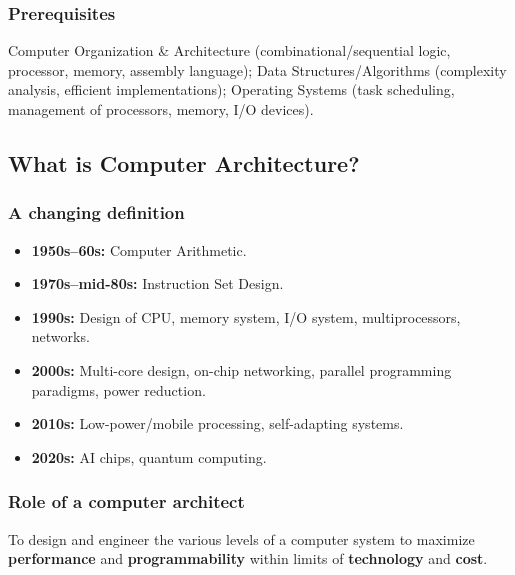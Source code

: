 \subsubsection{Prerequisites}
Computer Organization \& Architecture (combinational/sequential logic,
processor, memory, assembly language); Data Structures/Algorithms
(complexity analysis, efficient implementations); Operating Systems (task
scheduling, management of processors, memory, I/O devices).

\subsection{What is Computer Architecture?}

\subsubsection{A changing definition}
\begin{itemize}
  \item \textbf{1950s--60s:} Computer Arithmetic.
  \item \textbf{1970s--mid-80s:} Instruction Set Design.
  \item \textbf{1990s:} Design of CPU, memory system, I/O system,
  multiprocessors, networks.
  \item \textbf{2000s:} Multi-core design, on-chip networking, parallel
  programming paradigms, power reduction.
  \item \textbf{2010s:} Low-power/mobile processing, self-adapting systems.
  \item \textbf{2020s:} AI chips, quantum computing.
\end{itemize}

\subsubsection{Role of a computer architect}
\begin{definition}
To design and engineer the various levels of a computer system to
maximize \textbf{performance} and \textbf{programmability} within limits
of \textbf{technology} and \textbf{cost}.
\end{definition}

